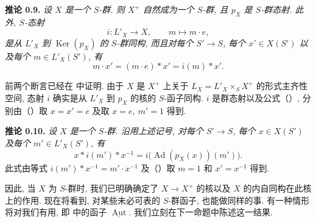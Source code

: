 \medskip
\noindent{}\textbf{推论 0.9.}
\textit{设 \(X\) 是一个 \(S\)-群. 则 \(X^+\) 自然成为一个
\(S\)-群, 且 \(p_X\) 是 \(S\)-群态射. 此外, \(S\)-态射}
\[
 i:L'_X\longrightarrow X,
 \qquad m\longmapsto m\mathbin{\cdot}e,
\]
\textit{是从 \(L'_X\) 到 \(\operatorname{Ker}(p_X)\) 的
\(S\)-群同构, 而且对每个 \(S'\to S\), 每个
\(x'\in X(S')\) 以及每个 \(m\in L'_X(S')\), 有}
\begin{equation}
 m\mathbin{\cdot}x'
 =(m\mathbin{\cdot}e)\ast x'
 =i(m)\ast x'.
 \tag{0.9.1}\label{sga3:iii:corollary:0-9:equation:0-9-1}
\end{equation}

前两个断言已经在  中证明.
由于 \(X\) 是 \(X^+\) 上关于
\(L_X=L'_X\times_S X^+\) 的形式主齐性空间,
态射 \(i\) 确实是从 \(L'_X\) 到 \(p_X\) 的核的 \(S\)-函子同构.
\(i\) 是群态射以及公式（）,
分别由（）取
\(x=x'=e\) 及取 \(x=e,\ m'=1\) 得到.

\medskip
\noindent{}\textbf{推论 0.10.}
\textit{设 \(X\) 是一个 \(S\)-群. 沿用上述记号,
对每个 \(S'\to S\), 每个 \(x\in X(S')\) 及每个
\(m'\in L'_X(S')\), 有}
\begin{equation}
 x\ast i(m')\ast x^{-1}
 =i\bigl(\operatorname{Ad}(p_X(x))(m')\bigr).
 \tag{0.10.1}\label{sga3:iii:corollary:0-10:equation:0-10-1}
\end{equation}
此式由等式 \(i(m')\ast x^{-1}=m'\mathbin{\cdot}x^{-1}\)
及（）取
\(m=1\) 和 \(x'=x^{-1}\) 得到.

因此, 当 \(X\) 为 \(S\)-群时, 我们已明确确定了 \(X\to X^+\)
的核以及 \(X\) 的内自同构在此核上的作用.
现在将看到, 对某些未必可表的 \(S\)-群函子, 也能做同样的事.
有一种情形将对我们有用, 即
中的函子 \(\underline{\operatorname{Aut}}\). 我们立刻在下一命题中陈述这一结果.

